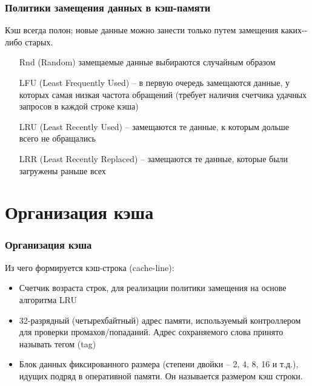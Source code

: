 \documentclass{beamer}
\begin{document}

\begin{frame}
\frametitle{Политики замещения данных в кэш-памяти}

Кэш всегда полон; новые данные можно занести только путем замещения каких-­либо старых.
\begin{itemize}
\item[Rnd] (Random) замещаемые данные выбираются случайным образом
\item[LFU] (Least Frequently Used) -- в первую очередь замещаются данные, у которых самая низкая частота обращений (требует наличия счетчика удачных запросов в каждой строке кэша)
\item[LRU] (Least Recently Used) -- замещаются те данные, к которым дольше всего не обращались
\item[LRR] (Least Recently Replaced) -- замещаются те данные, которые были загружены раньше всех

\end{itemize}

\end{frame}


\section{Организация кэша}

\begin{frame}
\frametitle{Организация кэша}

Из чего формируется кэш-строка (cache-line):
\begin{itemize}
\item Счетчик возраста строк, для реализации политики замещения на основе алгоритма LRU
\item 32-разрядный (четырехбайтный) адрес памяти, используемый контроллером для проверки промахов/попаданий. Адрес сохраняемого слова принято называть тегом (tag)
\item Блок данных фиксированного размера (степени двойки -- 2, 4, 8, 16 и т.д.), идущих подряд в оперативной памяти. Он называется размером кэш строки.

\end{itemize}

\end{frame}

\end{document}

